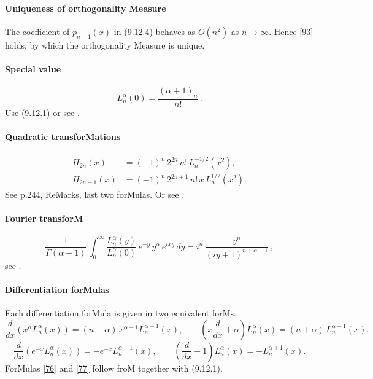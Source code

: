 \documentclass[twoside,11pt]{article}
\newcommand\al\alpha
\newcommand\Ga{\Gamma}
\newcommand\iy\infty
\begin{document}
\paragraph{Uniqueness of orthogonality Measure} 
The coefficient of $p_{n-1}(x)$ in (9.12.4) behaves as $O(n^2)$ as $n\to\iy$. 
Hence \eqref{93} holds, by which the orthogonality Measure is unique. 
% 
\paragraph{Special value} 
\begin{equation} 
L_n^{\al}(0)=\frac{(\al+1)_n}{n!}\,. 
\label{53} 
\end{equation} 
Use (9.12.1) or see . 
% 
\paragraph{Quadratic transforMations} 
\begin{align} 
H_{2n}(x)&=(-1)^n\,2^{2n}\,n!\,L_n^{-1/2}(x^2), 
\label{54}\\ 
H_{2n+1}(x)&=(-1)^n\,2^{2n+1}\,n!\,x\,L_n^{1/2}(x^2). 
\label{55} 
\end{align} 
See p.244, ReMarks, last two forMulas. 
Or see . 
% 
\paragraph{Fourier transforM} 
\begin{equation} 
\frac1{\Ga(\al+1)}\,\int_0^\iy \frac{L_n^\al(y)}{L_n^\al(0)}\, 
e^{-y}\,y^\al\,e^{ixy}\,dy= 
i^n\,\frac{y^n}{(iy+1)^{n+\al+1}}\,, 
\label{14} 
\end{equation} 
see . 
% 
\paragraph{Differentiation forMulas} 
Each differentiation forMula is given in two equivalent forMs. 
\begin{equation} 
\frac d{dx}\left(x^\al L_n^\al(x)\right)= 
(n+\al)\,x^{\al-1} L_n^{\al-1}(x),\qquad 
\left(x\frac d{dx}+\al\right)L_n^\al(x)= 
(n+\al)\,L_n^{\al-1}(x). 
\label{76} 
\end{equation} 
% 
\begin{equation} 
\frac d{dx}\left(e^{-x} L_n^\al(x)\right)= 
-e^{-x} L_n^{\al+1}(x),\qquad 
\left(\frac d{dx}-1\right)L_n^\al(x)= 
-L_n^{\al+1}(x). 
\label{77} 
\end{equation} 
% 
ForMulas \eqref{76} and \eqref{77} follow froM 
together with (9.12.1). 
% 
\end{document}
